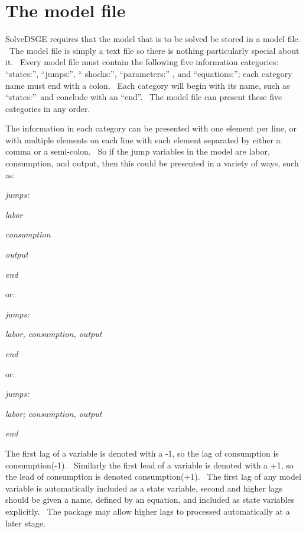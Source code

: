 \documentclass[notitlepage,11pt]{article}
\begin{document}
\section{The model file}

SolveDSGE requires that the model that is to be solved be stored in a model
file. \ The model file is simply a text file so there is nothing
particularly special about it. \ Every model file must contain the following
five information categories: \textquotedblleft states:\textquotedblright ,
\textquotedblleft jumps:\textquotedblright , \textquotedblleft
shocks:\textquotedblright , \textquotedblleft parameters:\textquotedblright
, and \textquotedblleft equations:\textquotedblright ; each category name
must end with a colon. \ Each category will begin with its name, such as
\textquotedblleft states:\textquotedblright\ and conclude with an
\textquotedblleft end\textquotedblright . \ The model file can present these
five categories in any order.

The information in each category can be presented with one element per line,
or with multiple elements on each line with each element separated by either
a comma or a semi-colon. \ So if the jump variables in the model are labor,
consumption, and output, then this could be presented in a variety of ways,
such as:

\bigskip

\textit{jumps:}

\textit{labor}

\textit{consumption}

\textit{output}

\textit{end}

\bigskip

or:

\textit{jumps:}

\textit{labor, consumption, output}

\textit{end}

\bigskip

or:

\textit{jumps:}

\textit{labor; consumption, output}

\textit{end}

\bigskip

The first lag of a variable is denoted with a -1, so the lag of consumption
is consumption(-1). \ Similarly the first lead of a variable is denoted with
a +1, so the lead of consumption is denoted consumption(+1). \ The first lag
of any model variable is automatically included as a state variable, second
and higher lags should be given a name, defined by an equation, and included
as state variables explicitly. \ The package may allow higher lags to
processed automatically at a later stage.
\end{document}
